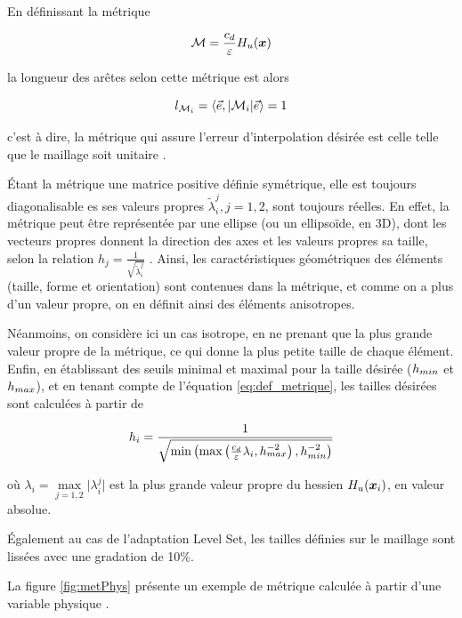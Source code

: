 \indent En définissant la métrique

\begin{equation}
	\label{eq:def_metrique}
	\mathcal{M} = \frac{c_d}{\varepsilon}H_u(\boldsymbol{x})
\end{equation}

\noindent la longueur des arêtes selon cette métrique est alors

\begin{equation*}
	l_{\mathcal{M}_i} = \langle \vec{e}, |\mathcal{M}_i| \vec{e} \rangle = 1
\end{equation*}

\noindent c'est à dire, la métrique qui assure l'erreur d'interpolation désirée est celle telle que le maillage soit unitaire \cite{cecile_these,frey_alauzet}.

\indent Étant la métrique une matrice positive définie symétrique, elle est toujours diagonalisable es ses valeurs propres \(\tilde{\lambda}_i^j, j=1,2\), sont toujours réelles. En effet, la métrique peut être représentée par une ellipse (ou un ellipsoïde, en 3D), dont les vecteurs propres donnent la direction des axes et les valeurs propres sa taille, selon la relation \(h_j =  \frac{1}{\sqrt{\tilde{\lambda}_i^j}}\) \cite{leo}. Ainsi, les caractéristiques géométriques des éléments (taille, forme et orientation) sont contenues dans la métrique, et comme on a plus d'un valeur propre, on en définit ainsi des éléments anisotropes.

\indent Néanmoins, on considère ici un cas isotrope, en ne prenant que la plus grande valeur propre de la métrique, ce qui donne la plus petite taille de chaque élément. Enfin, en établissant des seuils minimal et maximal pour la taille désirée (\(h_{min}\) et \(h_{max}\)), et en tenant compte de l'équation \eqref{eq:def_metrique}, les tailles désirées sont calculées à partir de

\begin{equation*}
	h_i = \frac{1}{\sqrt{\min\left(\max\left(\frac{c_d}{\varepsilon}\lambda_i,h_{max}^{-2}\right),h_{min}^{-2}\right)}}
\end{equation*}

\noindent où \(\lambda_i = \max\limits_{j=1,2}{|\lambda_i^j}|\) est la plus grande valeur propre du hessien \(H_u(\boldsymbol{x}_i) \), en valeur absolue.

\indent Également au cas de l'adaptation Level Set, les tailles définies sur le maillage sont lissées avec une gradation de 10\%.

\indent La figure \ref{fig:metPhys} présente un exemple de métrique calculée à partir d'une variable physique .

